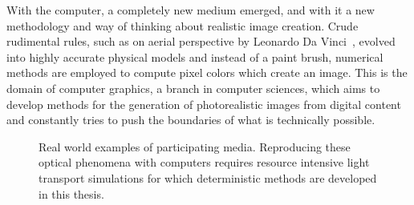 With the computer, a completely new medium emerged, and with it a new methodology and way of thinking about realistic image creation. Crude rudimental rules, such as on aerial perspective by Leonardo Da Vinci~\cite{DaVinci1651}, evolved into highly accurate physical models and instead of a paint brush, numerical methods are employed to compute pixel colors which create an image. This is the domain of computer graphics, a branch in computer sciences, which aims to develop methods for the generation of photorealistic images from digital content and constantly tries to push the boundaries of what is technically possible.
\begin{figure}[ht]
\begin{center}
\end{center}
\caption{Real world examples of participating media. Reproducing these optical phenomena with computers requires resource intensive light transport simulations for which deterministic methods are developed in this thesis\protect\footnotemark.}
\label{fig:intro_participating_media_examples}
\end{figure}

